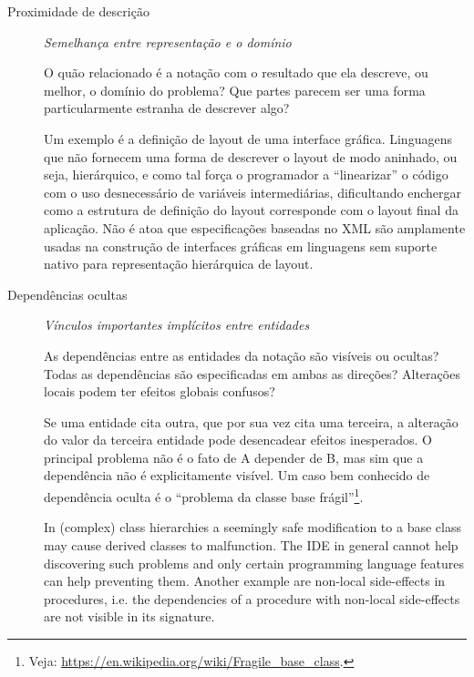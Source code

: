 \begin{description}
\item[{Proximidade de descrição}]  \emph{Semelhança entre representação e o domínio}

O quão relacionado é a notação com o resultado que ela descreve, ou
melhor, o domínio do problema? Que partes parecem ser uma forma
particularmente estranha de descrever algo?

\begin{citacao}
  Um exemplo é a definição de layout de uma interface gráfica. Linguagens que
  não fornecem uma forma de descrever o layout de modo aninhado, ou seja,
  hierárquico, e como tal força o programador a “linearizar” o código com o uso
  desnecessário de variáveis intermediárias, dificultando enchergar como a
  estrutura de definição do layout corresponde com o layout final da aplicação.
  Não é atoa que especificações baseadas no XML são amplamente usadas na
  construção de interfaces gráficas em linguagens sem suporte nativo para
  representação hierárquica de layout.
  \cite[p.~13; tradução nossa]{kiss2014}
\end{citacao}

\item[{Dependências ocultas}] \emph{Vínculos importantes implícitos entre entidades}

As dependências entre as entidades da notação são visíveis ou ocultas?
Todas as dependências são especificadas em ambas as direções? Alterações
locais podem ter efeitos globais confusos?

Se uma entidade cita outra, que por sua vez cita uma terceira, a
alteração do valor da terceira entidade pode desencadear efeitos
inesperados. O principal problema não é o fato de A depender de B, mas sim
que a dependência não é explicitamente visível. Um caso bem conhecido de dependência
oculta é o “problema da classe base frágil”\footnote{Veja: \url{https://en.wikipedia.org/wiki/Fragile\_base\_class}.}.

\begin{citacao}
  In (complex) class hierarchies a seemingly safe modification to a base class
  may cause derived classes to malfunction. The IDE in general cannot help
  discovering such problems and only certain programming language features can
  help preventing them. Another example are non-local side-effects in
  procedures, i.e. the dependencies of a procedure with non-local side-effects
  are not visible in its signature.
  \cite[pg.~14]{kiss2014}
\end{citacao}


\end{description}
